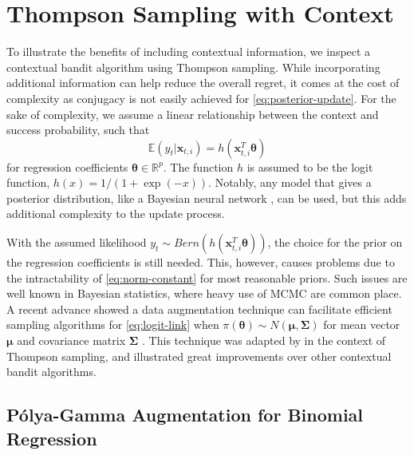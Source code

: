 \documentclass[12pt]{article}
\begin{document}
\section{Thompson Sampling with Context}

To illustrate the benefits of including contextual information, we inspect a 
contextual bandit algorithm using Thompson sampling.
While incorporating additional information can help reduce the overall regret, 
it comes at the cost of complexity as conjugacy is not easily achieved for 
\eqref{eq:posterior-update}.
For the sake of complexity, we assume a linear relationship between the context 
and success probability, such that
\begin{equation}
\mathbb{E}(y_t \vert \bm{x}_{t,i}) = h(\bm{x}_{t,i}^T \bm{\theta})
\label{eq:logit-link}
\end{equation}
for regression coefficients $\bm{\theta} \in \mathbb{R}^p$. 
The function $h$ is assumed to be the logit function, 
$h(x) = 1 / (1 + \exp(-x))$.
Notably, any model that gives a posterior distribution, like a Bayesian neural 
network \cite{riquelme2018deep}, can be used, but this adds additional complexity 
to the update process.

With the assumed likelihood $y_t \sim Bern(h(\bm{x}_{t,i}^T \bm{\theta}))$, the
choice for the prior on the regression coefficients is still needed.
This, however, causes problems due to the intractability of \eqref{eq:norm-constant}
for most reasonable priors.
Such issues are well known in Bayesian statistics, where heavy use of MCMC are 
common place.
A recent advance showed a data augmentation technique can facilitate efficient
sampling algorithms for \eqref{eq:logit-link} when 
$\pi(\bm{\theta}) \sim N(\bm{\mu}, \bm{\Sigma})$ 
for mean vector $\bm{\mu}$ and covariance matrix $\bm{\Sigma}$ 
\cite{polson2013bayesian}.
This technique was adapted by \cite{dumitrascu2018pg} in the context of Thompson 
sampling, and illustrated great improvements over other contextual bandit 
algorithms.

\subsection{P\'olya-Gamma Augmentation for Binomial Regression}
\end{document}
